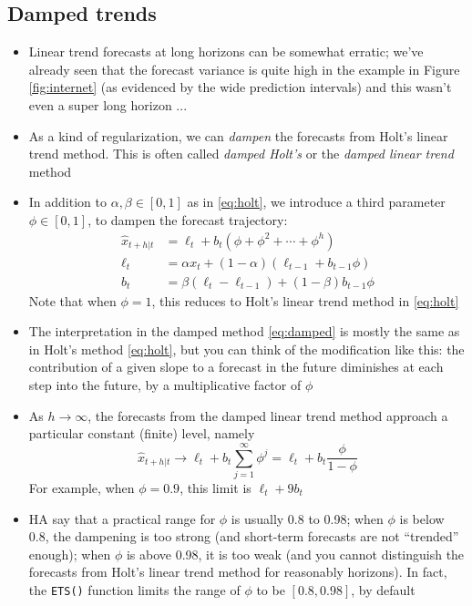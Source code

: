 \documentclass{article}
\begin{document}
\subsection{Damped trends}

\begin{itemize}
\item Linear trend forecasts at long horizons can be somewhat erratic; we've 
  already seen that the forecast variance is quite high in the example in Figure
  \ref{fig:internet} (as evidenced by the wide prediction intervals) and this
  wasn't even a super long horizon ...

\item As a kind of regularization, we can \emph{dampen} the forecasts from
  Holt's linear trend method. This is often called \emph{damped Holt's} or the
  \emph{damped linear trend} method 

\item In addition to $\alpha,\beta \in [0,1]$ as in \eqref{eq:holt}, we
  introduce a third parameter $\phi \in [0,1]$, to dampen the forecast
  trajectory: 
  \begin{equation}
  \label{eq:damped}
  \begin{aligned}
  \hat{x}_{t+h | t} &= \ell_t + b_t (\phi + \phi^2 + \cdots + \phi^h) \\ 
  \ell_t &= \alpha x_t + (1-\alpha) (\ell_{t-1} + b_{t-1} \phi) \\
  b_t &= \beta (\ell_t - \ell_{t-1}) + (1-\beta) b_{t-1} \phi
  \end{aligned}
  \end{equation}
  Note that when $\phi = 1$, this reduces to Holt's linear trend method in
  \eqref{eq:holt} 

\item The interpretation in the damped method \eqref{eq:damped} is mostly the
  same as in Holt's method \eqref{eq:holt}, but you can think of the
  modification like this: the contribution of a given slope to a forecast in the
  future diminishes at each step into the future, by a multiplicative factor of
  $\phi$   

\item As $h \to \infty$, the forecasts from the damped linear trend method
  approach a particular constant (finite) level, namely
  \[
  \hat{x}_{t+h | t} \to \ell_t + b_t \sum_{j=1}^\infty \phi^j = \ell_t + b_t
  \frac{\phi}{1-\phi} 
  \]
  For example, when $\phi = 0.9$, this limit is $\ell_t + 9 b_t$

\item HA say that a practical range for $\phi$ is usually 0.8 to 0.98; when
  $\phi$ is below 0.8, the dampening is too strong (and short-term forecasts are
  not ``trended'' enough); when $\phi$ is above 0.98, it is too weak (and you
  cannot distinguish the forecasts from Holt's linear trend method for
  reasonably horizons). In fact, the \verb|ETS()| function limits the range of
  $\phi$ to be $[0.8, 0.98]$, by default


\end{itemize}
\end{document}
